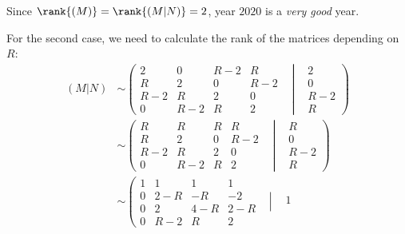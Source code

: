 \documentclass[../../main.tex]{subfiles}
\begin{document}
  Since $\rank{(M)} = \rank{(M | N)} = 2$, year $2020$ is a \textit{very good} year.

  For the second case, we need to calculate the rank of the matrices depending on $R$:
  \begin{equation*}
    \begin{split}
      (M | N) & \sim \left(
        \begin{matrix}
            2   &   0   & R - 2 &   R   & \\
            R   &   2   &   0   & R - 2 & \\
          R - 2 &   R   &   2   &   0   & \\
            0   & R - 2 &   R   &   2   &
        \end{matrix}
        \left|
          \begin{matrix}
            &   2   \\
            &   0   \\
            & R - 2 \\
            &   R
          \end{matrix}
        \right .
      \right) \\ & \sim \left(
        \begin{matrix}
            R   &   R   & R &   R   & \\
            R   &   2   & 0 & R - 2 & \\
          R - 2 &   R   & 2 &   0   & \\
            0   & R - 2 & R &   2   &
        \end{matrix}
        \left|
          \begin{matrix}
            &   R   \\
            &   0   \\
            & R - 2 \\
            &   R
          \end{matrix}
        \right .
      \right) \\ & \sim \left(
        \begin{matrix}
          1 &   1   &   1   &   1   & \\
          0 & 2 - R &  - R  &  - 2  & \\
          0 &   2   & 4 - R & 2 - R & \\
          0 & R - 2 &   R   &   2   &
        \end{matrix}
        \left|
          \begin{matrix}
            &  1  \\

\end{matrix}
\end{split}
\end{equation*}
\end{document}
